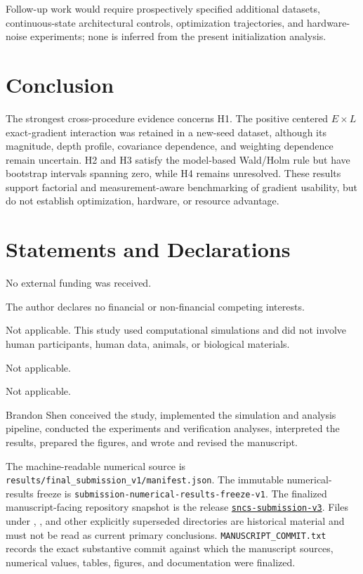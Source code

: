 \documentclass[pdflatex,sn-basic,Numbered]{sn-jnl}
\begin{document}
Follow-up work would require prospectively specified additional datasets, continuous-state architectural controls, optimization trajectories, and hardware-noise experiments; none is inferred from the present initialization analysis.

\section{Conclusion}\label{sec:conclusion}

The strongest cross-procedure evidence concerns H1. The positive centered $E\times L$ exact-gradient interaction was retained in a new-seed dataset, although its magnitude, depth profile, covariance dependence, and weighting dependence remain uncertain. H2 and H3 satisfy the model-based Wald/Holm rule but have bootstrap intervals spanning zero, while H4 remains unresolved. These results support factorial and measurement-aware benchmarking of gradient usability, but do not establish optimization, hardware, or resource advantage.

\backmatter

\section*{Statements and Declarations}

 No external funding was received.

 The author declares no financial or non-financial competing interests.

 Not applicable. This study used computational simulations and did not involve human participants, human data, animals, or biological materials.

 Not applicable.

 Not applicable.

 Brandon Shen conceived the study, implemented the simulation and analysis pipeline, conducted the experiments and verification analyses, interpreted the results, prepared the figures, and wrote and revised the manuscript.

 The machine-readable numerical source is \texttt{results/final\_submission\_v1/manifest.json}. The immutable numerical-results freeze is \nolinkurl{submission-numerical-results-freeze-v1}. The finalized manuscript-facing repository snapshot is the release \href{https://github.com/Brandon-Shen/few-qubit-qnn-snr/releases/tag/sncs-submission-v3}{\texttt{sncs-submission-v3}}. Files under , , and other explicitly superseded directories are historical material and must not be read as current primary conclusions. \texttt{MANUSCRIPT\_COMMIT.txt} records the exact substantive commit against which the manuscript sources, numerical values, tables, figures, and documentation were finalized.
\end{document}
